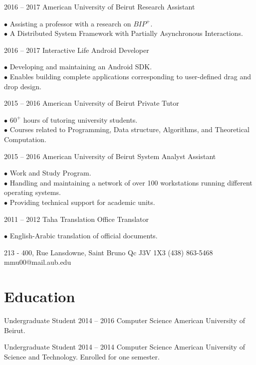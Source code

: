 \documentclass{tccv}
\begin{document}
\begin{eventlist}

\item{2016 -- 2017}
     {American University of Beirut}
     {Research Assistant}

$\bullet$ Assisting a professor with a research on $BIP^+$.\\
$\bullet$ A Distributed System Framework with Partially Asynchronous Interactions.

\item{2016 -- 2017}
     {Interactive Life}
     {Android Developer}

$\bullet$ Developing and maintaining an Android SDK.\\
$\bullet$ Enables building complete applications corresponding to user-defined drag and drop design.

\item{2015 -- 2016}
     {American University of Beirut}
     {Private Tutor}

$\bullet$ $60^+$ hours of tutoring university students.\\
$\bullet$ Courses related to Programming, Data structure, Algorithms, and Theoretical Computation.

\item{2015 -- 2016}
     {American University of Beirut}
     {System Analyst Assistant}

$\bullet$ Work and Study Program.\\
$\bullet$ Handling and maintaining a network of over 100 workstations running different operating systems. \\
$\bullet$ Providing technical support for academic units.

\item{2011 -- 2012}
     {Taha Translation Office}
     {Translator}

$\bullet$ English-Arabic translation of official documents.

\end{eventlist}



\personal
    {213 - 400,  Rue Lansdowne, Saint Bruno \hspace{1cm} Qc J3V 1X3}
    {(438) 863-5468}
    {mmu00@mail.aub.edu}

\section{Education}

\begin{yearlist}

\item[Undergraduate Student]{2014 -- 2016}
     {Computer Science} 
     {American University of Beirut.}


\item[Undergraduate Student]{2014 -- 2014}
     {Computer Science} 
     {American University of Science and Technology. Enrolled for one semester.}

\end{yearlist}
\end{document}
